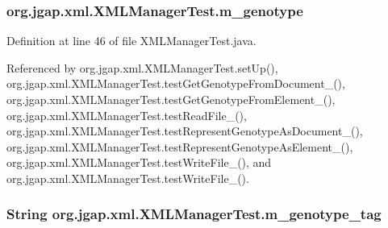 \hypertarget{classorg_1_1jgap_1_1xml_1_1_x_m_l_manager_test_aa85fe08f8c8d7342b3f9bce6d85036eb}{
\subsubsection[{m\-\_\-genotype}]{ org.\-jgap.\-xml.\-X\-M\-L\-Manager\-Test.\-m\-\_\-genotype\hspace{0.3cm}{\ttfamily [private]}}}\label{classorg_1_1jgap_1_1xml_1_1_x_m_l_manager_test_aa85fe08f8c8d7342b3f9bce6d85036eb}


Definition at line 46 of file X\-M\-L\-Manager\-Test.\-java.



Referenced by org.\-jgap.\-xml.\-X\-M\-L\-Manager\-Test.\-set\-Up(), org.\-jgap.\-xml.\-X\-M\-L\-Manager\-Test.\-test\-Get\-Genotype\-From\-Document\-\_(), org.\-jgap.\-xml.\-X\-M\-L\-Manager\-Test.\-test\-Get\-Genotype\-From\-Element\-\_(), org.\-jgap.\-xml.\-X\-M\-L\-Manager\-Test.\-test\-Read\-File\-\_(), org.\-jgap.\-xml.\-X\-M\-L\-Manager\-Test.\-test\-Represent\-Genotype\-As\-Document\-\_(), org.\-jgap.\-xml.\-X\-M\-L\-Manager\-Test.\-test\-Represent\-Genotype\-As\-Element\-\_(), org.\-jgap.\-xml.\-X\-M\-L\-Manager\-Test.\-test\-Write\-File\-\_(), and org.\-jgap.\-xml.\-X\-M\-L\-Manager\-Test.\-test\-Write\-File\-\_().

\hypertarget{classorg_1_1jgap_1_1xml_1_1_x_m_l_manager_test_a1696ad6169759c4423b1454f63d3fc0a}{
\subsubsection[{m\-\_\-genotype\-\_\-tag}]{\setlength{\rightskip}{0pt plus 5cm}String org.\-jgap.\-xml.\-X\-M\-L\-Manager\-Test.\-m\-\_\-genotype\-\_\-tag\hspace{0.3cm}{\ttfamily [private]}}}\label{classorg_1_1jgap_1_1xml_1_1_x_m_l_manager_test_a1696ad6169759c4423b1454f63d3fc0a}


